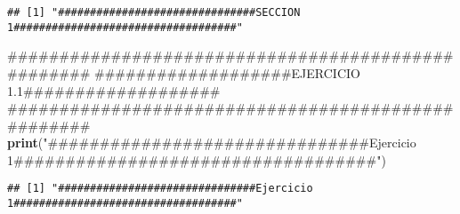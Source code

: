 \documentclass[]{article}
\newenvironment{Shaded}{\begin{snugshade}}{\end{snugshade}}
\newcommand{\KeywordTok}[1]{\textcolor[rgb]{0.13,0.29,0.53}{\textbf{{#1}}}}
\newcommand{\StringTok}[1]{\textcolor[rgb]{0.31,0.60,0.02}{{#1}}}
\newcommand{\NormalTok}[1]{{#1}}
\begin{document}
\begin{verbatim}
## [1] "###############################SECCION 1###################################"
\end{verbatim}

\begin{Shaded}
\begin{Highlighting}[]
\NormalTok{###################################################}
\NormalTok{###################EJERCICIO 1.1###################}
\NormalTok{###################################################}
\KeywordTok{print}\NormalTok{(}\StringTok{"###############################Ejercicio 1###################################"}\NormalTok{)}
\end{Highlighting}
\end{Shaded}

\begin{verbatim}
## [1] "###############################Ejercicio 1###################################"
\end{verbatim}
\end{document}
